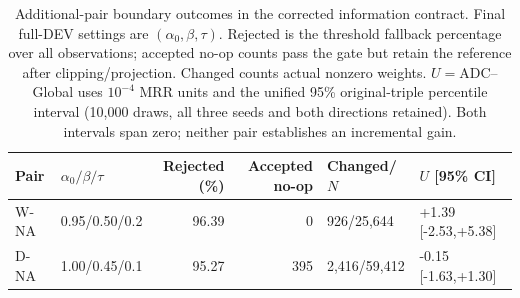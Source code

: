 \begin{table}[htbp]
\centering\footnotesize\setlength{\tabcolsep}{3pt}
\caption{Additional-pair boundary outcomes in the corrected information contract. Final full-DEV settings are $(\alpha_0,\beta,\tau)$. Rejected is the threshold fallback percentage over all observations; accepted no-op counts pass the gate but retain the reference after clipping/projection. Changed counts actual nonzero weights. $U=$ADC--Global uses $10^{-4}$ MRR units and the unified 95\% original-triple percentile interval (10,000 draws, all three seeds and both directions retained). Both intervals span zero; neither pair establishes an incremental gain.}
\label{tab:scope-additional}
\begin{tabular}{llrrll}
\toprule
Pair & $\alpha_0/\beta/\tau$ & Rejected (\%) & Accepted no-op & Changed/$N$ & $U$ [95\% CI]\\
\midrule
W-NA & 0.95/0.50/0.2 & 96.39 & 0 & 926/25,644 & +1.39 [-2.53,+5.38]\\
D-NA & 1.00/0.45/0.1 & 95.27 & 395 & 2,416/59,412 & -0.15 [-1.63,+1.30]\\
\bottomrule
\end{tabular}
\end{table}

